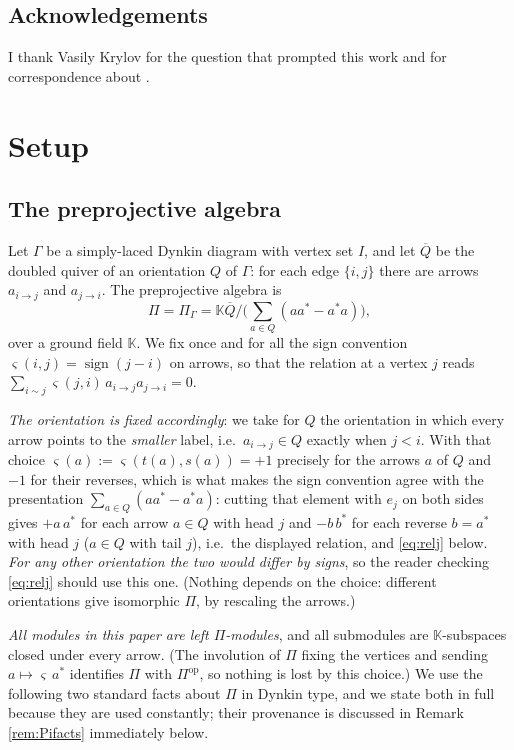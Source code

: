 \documentclass[reqno]{amsart}
\theoremstyle{plain}
\theoremstyle{definition}
\newcommand{\Pia}{\Pi}
\begin{document}
\subsection*{Acknowledgements}
I thank Vasily Krylov for the question that prompted this work and for
correspondence about \cite{DKK}.

\section{Setup}\label{sec:setup}

\subsection{The preprojective algebra}
Let $\Gamma$ be a simply-laced Dynkin diagram with vertex set $I$, and let
$\overline{Q}$ be the doubled quiver of an orientation $Q$ of $\Gamma$: for
each edge $\{i,j\}$ there are arrows $a_{i\to j}$ and $a_{j\to i}$.  The
preprojective algebra is
\[
   \Pia=\Pia_\Gamma=\mathbb{K}\overline{Q}\Big/
   \Big(\sum_{a\in Q}(aa^*-a^*a)\Big),
\]
over a ground field $\mathbb{K}$.  We fix once and for all the sign convention
$\varsigma(i,j)=\operatorname{sign}(j-i)$ on arrows, so that the relation at a
vertex $j$ reads $\sum_{i\sim j}\varsigma(j,i)\,a_{i\to j}a_{j\to i}=0$.

\emph{The orientation is fixed accordingly}: we take for $Q$ the orientation in
which every arrow points to the \emph{smaller} label, i.e.\ $a_{i\to j}\in Q$
exactly when $j<i$.  With that choice $\varsigma(a):=\varsigma(t(a),s(a))=+1$
precisely for the arrows $a$ of $Q$ and $-1$ for their reverses, which is what
makes the sign convention agree with the presentation
$\sum_{a\in Q}(aa^{*}-a^{*}a)$: cutting that element with $e_j$ on both sides
gives $+a\,a^{*}$ for each arrow $a\in Q$ with head $j$ and $-b\,b^{*}$ for each
reverse $b=a^{*}$ with head $j$ \textup{(}$a\in Q$ with tail $j$\textup{)},
i.e.\ the displayed relation, and \eqref{eq:relj} below.  \emph{For any other orientation the two would differ by
signs}, so the reader checking \eqref{eq:relj} should use this one.  (Nothing
depends on the choice: different orientations give isomorphic $\Pia$, by
rescaling the arrows.)

\emph{All modules in this paper are left $\Pia$-modules}, and all submodules
are $\mathbb{K}$-subspaces closed under every arrow.  (The involution of
$\Pia$ fixing the vertices and sending $a\mapsto\varsigma\,a^{*}$ identifies
$\Pia$ with $\Pia^{\mathrm{op}}$, so nothing is lost by this choice.)  We use
the following two standard facts about $\Pia$ in Dynkin type, and we state
both in full because they are used constantly; their provenance is
discussed in Remark \ref{rem:Pifacts} immediately below.
\end{document}
